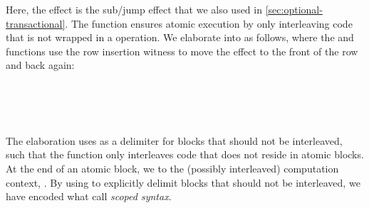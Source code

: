 %
%
Here, the  effect is the sub/jump effect that we also used in \cref{sec:optional-transactional}.
The  function ensures atomic execution by only interleaving code that is not wrapped in a  operation.
We elaborate  into  as follows, where the  and  functions use the row insertion witness  to move the  effect to the front of the row and back again:
%
\begin{code}%
%
\>[10]\AgdaSpace{}%
\AgdaSymbol{:}\AgdaSpace{}%
\AgdaSpace{}%
\AgdaSpace{}%
\AgdaSymbol{:}\AgdaSpace{}%
\AgdaSpace{}%
\AgdaSpace{}%
\AgdaSpace{}%
\AgdaSpace{}%
\AgdaSpace{}%
\AgdaSpace{}%
\AgdaSpace{}%
\AgdaSpace{}%
\<%
\\
%
\>[10]\AgdaSpace{}%
\AgdaSpace{}%
\AgdaSymbol{(}\AgdaSpace{}%
\AgdaSpace{}%
\AgdaOperator{\AgdaInductiveConstructor{,}}\AgdaSpace{}%
\AgdaSpace{}%
\AgdaOperator{\AgdaInductiveConstructor{,}}\AgdaSpace{}%
\AgdaSymbol{)}%
\>[42]\AgdaSymbol{=}\<%
\\
\>[10][@{}l@{\AgdaIndent{0}}]%
\>[12]\AgdaSpace{}%
\AgdaSymbol{(}\AgdaSpace{}%
\AgdaSymbol{(}\AgdaSpace{}%
\AgdaSymbol{(}\AgdaSpace{}%
\AgdaSymbol{))}\AgdaSpace{}%
\AgdaSymbol{(}\AgdaSpace{}%
\AgdaSymbol{(}\AgdaSpace{}%
\AgdaSymbol{)))}\AgdaSpace{}%
\AgdaSpace{}%
\<%
\\
%
\>[10]\AgdaSpace{}%
\AgdaSpace{}%
\AgdaSymbol{(}\AgdaSpace{}%
\AgdaSpace{}%
\AgdaOperator{\AgdaInductiveConstructor{,}}\AgdaSpace{}%
\AgdaSpace{}%
\AgdaOperator{\AgdaInductiveConstructor{,}}\AgdaSpace{}%
\AgdaSymbol{)}%
\>[43]\AgdaSymbol{=}\AgdaSpace{}%
\AgdaSpace{}%
\AgdaSpace{}%
\AgdaSpace{}%
\AgdaSpace{}%
\AgdaSpace{}%
\AgdaSpace{}%
\AgdaSpace{}%
\AgdaSpace{}%
\AgdaSymbol{)}\AgdaSpace{}%
\<%
\end{code}
%
The elaboration uses  as a delimiter for blocks that should not be interleaved, such that the  function only interleaves code that does not reside in atomic blocks.
At the end of an \ac{atomic} block, we  to the (possibly interleaved) computation context, .
By using  to explicitly delimit blocks that should not be interleaved, we have encoded what \citet[\S{}~7]{WuSH14} call \emph{scoped syntax}.

